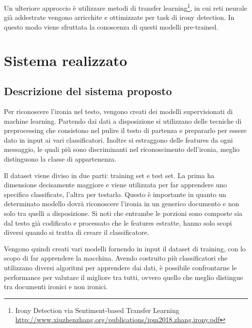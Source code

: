 \documentclass[oneside]{book}
\begin{document}
Un ulteriore approccio è utilizzare metodi di transfer learning\footnote{Irony Detection via Sentiment-based Transfer Learning\\ \url{http://www.xiuzhenzhang.org/publications/ipm2018.zhang.irony.pdf}}, in cui reti neurale già addestrate vengono arricchite e ottimizzate per task di irony detection. In questo modo viene sfruttata la conoscenza di questi modelli pre-trained.

\chapter{Sistema realizzato}

\section{Descrizione del sistema proposto}
Per riconoscere l'ironia nel testo, vengono creati dei modelli supervisionati di machine learning.
Partendo dai dati a disposizione si utilizzano delle tecniche di preprocessing che consistono nel pulire il testo di partenza e prepararlo per essere dato in input ai vari classificatori. Inoltre si estraggono delle features da ogni messaggio, le quali più sono discriminanti nel riconoscimento dell'ironia, meglio distinguono la classe di appartenenza.

Il dataset viene diviso in due parti: training set e test set. La prima ha dimensione decisamente maggiore e viene utilizzata per far apprendere uno specifico classificate, l'altra per testarlo. Questo è importante in quanto un determinato modello dovrà riconoscere l'ironia in un generico documento e non solo tra quelli a disposizione. Si noti che entrambe le porzioni sono composte sia dal testo già codificato e processato che le features estratte, hanno solo scopi diversi quando si tratta di creare il classificatore. 

Vengono quindi creati vari modelli fornendo in input il dataset di training, con lo scopo di far apprendere la macchina. Avendo costruito più classificatori che utilizzano diversi algoritmi per apprendere dai dati, è possibile confrontarne le performance per valutare il migliore tra tutti, ovvero quello che meglio distingue tra documenti ironici e non ironici.
\end{document}
